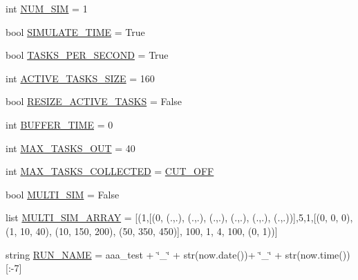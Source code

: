\begin{DoxyCompactItemize}
\item 
int \mbox{\hyperlink{namespacedynamicfilterapp_1_1toggles_a3baf5565851cd87736238d8dddfc1106}{N\+U\+M\+\_\+\+S\+IM}} = 1
\item 
bool \mbox{\hyperlink{namespacedynamicfilterapp_1_1toggles_af689b6dbf6a3a082bbfb9f6decf1a805}{S\+I\+M\+U\+L\+A\+T\+E\+\_\+\+T\+I\+ME}} = True
\item 
bool \mbox{\hyperlink{namespacedynamicfilterapp_1_1toggles_a61ac104de71d68599b307f679baf3ea0}{T\+A\+S\+K\+S\+\_\+\+P\+E\+R\+\_\+\+S\+E\+C\+O\+ND}} = True
\item 
int \mbox{\hyperlink{namespacedynamicfilterapp_1_1toggles_a374727dba0574510b39c1e2871f69e48}{A\+C\+T\+I\+V\+E\+\_\+\+T\+A\+S\+K\+S\+\_\+\+S\+I\+ZE}} = 160
\item 
bool \mbox{\hyperlink{namespacedynamicfilterapp_1_1toggles_ac82a59d01e707324a65d0af9b82c7f59}{R\+E\+S\+I\+Z\+E\+\_\+\+A\+C\+T\+I\+V\+E\+\_\+\+T\+A\+S\+KS}} = False
\item 
int \mbox{\hyperlink{namespacedynamicfilterapp_1_1toggles_a04a9eab148403f1f27d44b38211aad04}{B\+U\+F\+F\+E\+R\+\_\+\+T\+I\+ME}} = 0
\item 
int \mbox{\hyperlink{namespacedynamicfilterapp_1_1toggles_a27cea6b210bbcb9af3fbd7edc3901390}{M\+A\+X\+\_\+\+T\+A\+S\+K\+S\+\_\+\+O\+UT}} = 40
\item 
int \mbox{\hyperlink{namespacedynamicfilterapp_1_1toggles_aa05c90c0672e9b74717bdeabb00fd1bb}{M\+A\+X\+\_\+\+T\+A\+S\+K\+S\+\_\+\+C\+O\+L\+L\+E\+C\+T\+ED}} = \mbox{\hyperlink{namespacedynamicfilterapp_1_1toggles_a914791c176a78c026dc76a18bcd88d73}{C\+U\+T\+\_\+\+O\+FF}}
\item 
bool \mbox{\hyperlink{namespacedynamicfilterapp_1_1toggles_a8822be27c516d0f027cff60d067b6d87}{M\+U\+L\+T\+I\+\_\+\+S\+IM}} = False
\item 
list \mbox{\hyperlink{namespacedynamicfilterapp_1_1toggles_a220d8cf87bacce3b4d63c494c95b918e}{M\+U\+L\+T\+I\+\_\+\+S\+I\+M\+\_\+\+A\+R\+R\+AY}} = \mbox{[}(1,\mbox{[}(0, (.,.), (.,.), (.,.), (.,.), (.,.), (.,.))\mbox{]},5,1,\mbox{[}(0, 0, 0), (1, 10, 40), (10, 150, 200), (50, 350, 450)\mbox{]}, 100, 1, 4, 100, (0, 1))\mbox{]}
\item 
string \mbox{\hyperlink{namespacedynamicfilterapp_1_1toggles_a1e90a00628c373ad2f7e63b20ba08b9c}{R\+U\+N\+\_\+\+N\+A\+ME}} = \textquotesingle{}aaa\+\_\+test\textquotesingle{} + \char`\"{}\+\_\+\char`\"{} + str(now.\+date())+ \char`\"{}\+\_\+\char`\"{} + str(now.\+time())\mbox{[}\+:-\/7\mbox{]}
\item 

\end{DoxyCompactItemize}
